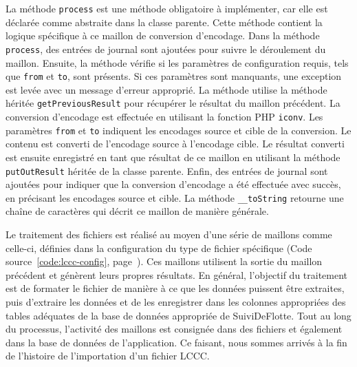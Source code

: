 
La méthode \Verb|process| est une méthode obligatoire à implémenter, car elle est déclarée comme abstraite dans la classe parente. Cette méthode contient la logique spécifique à ce maillon de conversion d'encodage. Dans la méthode \Verb|process|, des entrées de journal sont ajoutées pour suivre le déroulement du maillon. Ensuite, la méthode vérifie si les paramètres de configuration requis, tels que \Verb|from| et \Verb|to|, sont présents. Si ces paramètres sont manquants, une exception est levée avec un message d'erreur approprié. La méthode utilise la méthode héritée \Verb|getPreviousResult| pour récupérer le résultat du maillon précédent. La conversion d'encodage est effectuée en utilisant la fonction PHP \Verb|iconv|. Les paramètres \Verb|from| et \Verb|to| indiquent les encodages source et cible de la conversion. Le contenu est converti de l'encodage source à l'encodage cible. Le résultat converti est ensuite enregistré en tant que résultat de ce maillon en utilisant la méthode \Verb|putOutResult| héritée de la classe parente. Enfin, des entrées de journal sont ajoutées pour indiquer que la conversion d'encodage a été effectuée avec succès, en précisant les encodages source et cible. La méthode \Verb|__toString| retourne une chaîne de caractères qui décrit ce maillon de manière générale.

Le traitement des fichiers est réalisé au moyen d'une série de maillons comme celle-ci, définies dans la configuration du type de fichier spécifique (Code source~\ref{code:lccc-config}, page~\pageref{code:lccc-config}). Ces maillons utilisent la sortie du maillon précédent et génèrent leurs propres résultats. En général, l'objectif du traitement est de formater le fichier de manière à ce que les données puissent être extraites, puis d'extraire les données et de les enregistrer dans les colonnes appropriées des tables adéquates de la base de données appropriée de SuiviDeFlotte. Tout au long du processus, l'activité des maillons est consignée dans des fichiers et également dans la base de données de l'application. Ce faisant, nous sommes arrivés à la fin de l'histoire de l'importation d'un fichier LCCC.